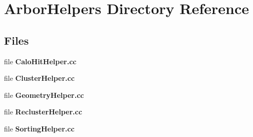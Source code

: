 \section{Arbor\+Helpers Directory Reference}
\label{dir_4d849cc5a1980be238c4afaed6e1ff94}
\subsection*{Files}
\begin{DoxyCompactItemize}
\item 
file {\bf Calo\+Hit\+Helper.\+cc}
\item 
file {\bf Cluster\+Helper.\+cc}
\item 
file {\bf Geometry\+Helper.\+cc}
\item 
file {\bf Recluster\+Helper.\+cc}
\item 
file {\bf Sorting\+Helper.\+cc}
\end{DoxyCompactItemize}
